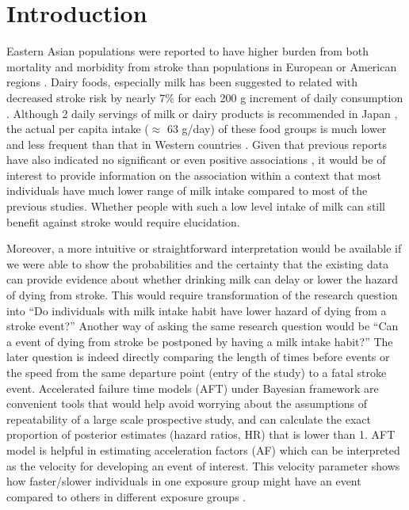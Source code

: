 \documentclass[nutrients,article,submitted,moreauthors,pdftex]{Definitions/mdpi}
\begin{document}

\hypertarget{introduction}{%
\section{Introduction}\label{introduction}}

Eastern Asian populations were reported to have higher burden from both
mortality and morbidity from stroke than populations in European or
American regions \citep{Kim2014}. Dairy foods, especially milk has been
suggested to related with decreased stroke risk by nearly 7\% for each
200 g increment of daily consumption \citep{DeGoede2016}. Although 2
daily servings of milk or dairy products is recommended in Japan
\citep{Yoshiike2007}, the actual per capita intake (\(\approx\) 63
g/day) of these food groups is much lower and less frequent than that in
Western countries \citep{Saito2019}. Given that previous reports have
also indicated no significant
\citep{Iso1999, sauvaget2003intake, Elwood2004} or even positive
associations \citep{Larsson2009}, it would be of interest to provide
information on the association within a context that most individuals
have much lower range of milk intake compared to most of the previous
studies. Whether people with such a low level intake of milk can still
benefit against stroke would require elucidation.

Moreover, a more intuitive or straightforward interpretation would be
available if we were able to show the probabilities and the certainty
that the existing data can provide evidence about whether drinking milk
can delay or lower the hazard of dying from stroke. This would require
transformation of the research question into ``Do individuals with milk
intake habit have lower hazard of dying from a stroke event?'' Another
way of asking the same research question would be ``Can a event of dying
from stroke be postponed by having a milk intake habit?'' The later
question is indeed directly comparing the length of times before events
or the speed from the same departure point (entry of the study) to a
fatal stroke event. Accelerated failure time models (AFT) under Bayesian
framework are convenient tools that would help avoid worrying about the
assumptions of repeatability of a large scale prospective study, and can
calculate the exact proportion of posterior estimates (hazard ratios,
HR) that is lower than 1. AFT model is helpful in estimating
acceleration factors (AF) which can be interpreted as the velocity for
developing an event of interest. This velocity parameter shows how
faster/slower individuals in one exposure group might have an event
compared to others in different exposure groups
\citep{Wei1992, ibrahim2014b}.
\end{document}

